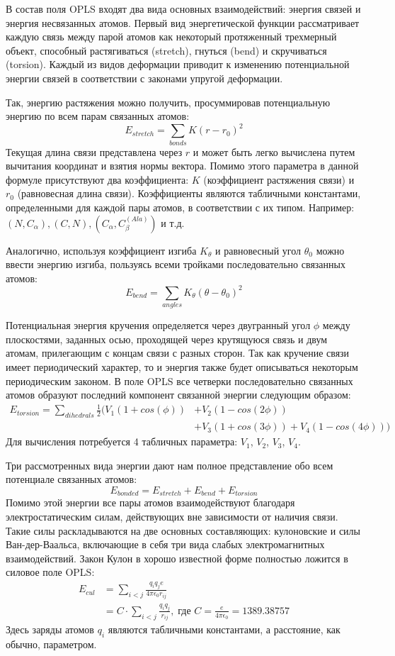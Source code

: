   В состав поля OPLS входят два вида основных взаимодействий: энергия связей и энергия несвязанных атомов.
  Первый вид энергетической функции рассматривает каждую связь между парой атомов как некоторый протяженный трехмерный объект, способный растягиваться (stretch), гнуться (bend) и скручиваться (torsion).
  Каждый из видов деформации приводит к изменению потенциальной энергии связей в соответствии с законами упругой деформации.

  Так, энергию растяжения можно получить, просуммировав потенциальную энергию по всем парам связанных атомов:
  $$
  E_{stretch} = \sum_{bonds}K(r - r_0)^2
  $$
  Текущая длина связи представлена через $r$ и может быть легко вычислена путем вычитания координат и взятия нормы вектора.
  Помимо этого параметра в данной формуле присутствуют два коэффициента: $K$ (коэффициент растяжения связи) и $r_0$ (равновесная длина связи).
  Коэффициенты являются табличными константами, определенными для каждой пары атомов, в соответствии с их типом.
  Например: $(N, C_{\alpha}), (C, N), (C_{\alpha}, C_{\beta}^{(Ala)})$ и т.д.

  Аналогично, используя коэффициент изгиба $K_{\theta}$ и равновесный угол $\theta_0$ можно ввести энергию изгиба, пользуясь всеми тройками последовательно связанных атомов:
  $$
  E_{bend} = \sum_{angles}K_{\theta}(\theta - \theta_0)^2
  $$

  Потенциальная энергия кручения определяется через двугранный угол $\phi$ между плоскостями, заданных осью, проходящей через крутящуюся связь и двум атомам, прилегающим с концам связи с разных сторон.
  Так как кручение связи имеет периодический характер, то и энергия также будет описываться некоторым периодическим законом.
  В поле OPLS все четверки последовательно связанных атомов образуют последний компонент связанной энергии следующим образом:
  $$
  \begin{aligned}
    E_{torsion} = \sum_{dihedrals}\frac{1}{2}(V_1(1 + cos(\phi)) &+ V_2(1 - cos(2\phi))\\
    &+ V_3(1 + cos(3\phi)) + V_4(1 - cos(4\phi)))
  \end{aligned}
  $$
  Для вычисления потребуется 4 табличных параметра: $V_1$, $V_2$, $V_3$, $V_4$.

  Три рассмотренных вида энергии дают нам полное представление обо всем потенциале связанных атомов:
  $$
  E_{bonded} = E_{stretch} + E_{bend} + E_{torsion}
  $$
  Помимо этой энергии все пары атомов взаимодействуют благодаря электростатическим силам, действующих вне зависимости от наличия связи.
  Такие силы раскладываются на две основных составляющих: кулоновские и силы Ван-дер-Ваальса, включающие в себя три вида слабых электромагнитных взаимодействий.
  Закон Кулон в хорошо известной форме полностью ложится в силовое поле OPLS:
  $$
  \begin{aligned}
  E_{cul} &= \sum_{i < j} \frac{q_i q_j e}{4 \pi \epsilon_0 r_{ij}} \\
         &= C \cdot \sum_{i < j} \frac{q_i q_j}{r_{ij}},\; \text{где } C = \frac{e}{4 \pi \epsilon_0} = 1389.38757  
  \end{aligned}
  $$
  Здесь заряды атомов $q_i$ являются табличными константами, а расстояние, как обычно, параметром.

